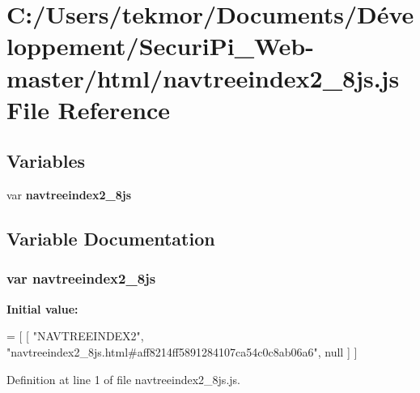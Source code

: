 \section{C\+:/\+Users/tekmor/\+Documents/\+Développement/\+Securi\+Pi\+\_\+\+Web-\/master/html/navtreeindex2\+\_\+8js.js File Reference}
\label{navtreeindex2__8js_8js}
\subsection*{Variables}
\begin{DoxyCompactItemize}
\item 
var {\bf navtreeindex2\+\_\+8js}
\end{DoxyCompactItemize}


\subsection{Variable Documentation}
\subsubsection[{navtreeindex2\+\_\+8js}]{\setlength{\rightskip}{0pt plus 5cm}var navtreeindex2\+\_\+8js}\label{navtreeindex2__8js_8js_ad48c658a6b879ad1fce8580d2e4c47a3}
{\bfseries Initial value\+:}
\begin{DoxyCode}
=
[
    [ \textcolor{stringliteral}{"NAVTREEINDEX2"}, \textcolor{stringliteral}{"navtreeindex2\_8js.html#aff8214ff5891284107ca54c0c8ab06a6"}, null ]
]
\end{DoxyCode}


Definition at line 1 of file navtreeindex2\+\_\+8js.\+js.

